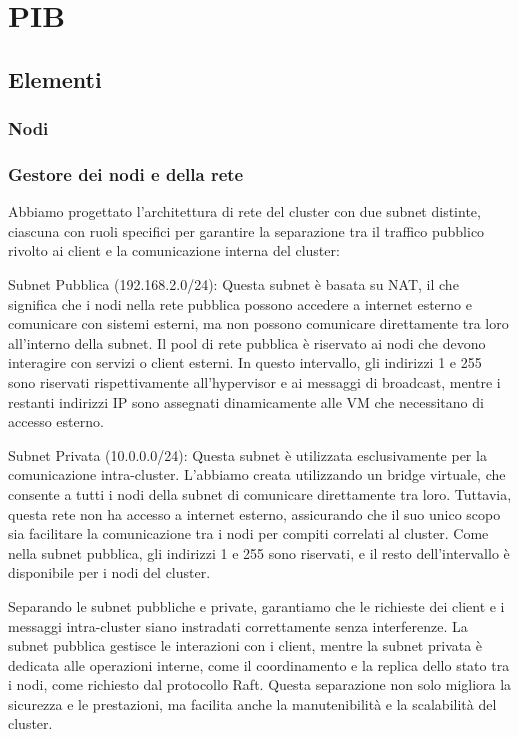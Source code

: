 
\section{PIB}
\subsection{Elementi}
\subsubsection{Nodi}

\subsubsection{Gestore dei nodi e della rete}
Abbiamo progettato l'architettura di rete del cluster con due subnet distinte, ciascuna con ruoli specifici per garantire la separazione tra il traffico pubblico rivolto ai client e la comunicazione interna del cluster:

    Subnet Pubblica (192.168.2.0/24): Questa subnet è basata su NAT, il che significa che i nodi nella rete pubblica possono accedere a internet esterno e comunicare con sistemi esterni, ma non possono comunicare direttamente tra loro all'interno della subnet. Il pool di rete pubblica è riservato ai nodi che devono interagire con servizi o client esterni. In questo intervallo, gli indirizzi 1 e 255 sono riservati rispettivamente all'hypervisor e ai messaggi di broadcast, mentre i restanti indirizzi IP sono assegnati dinamicamente alle VM che necessitano di accesso esterno.

    Subnet Privata (10.0.0.0/24): Questa subnet è utilizzata esclusivamente per la comunicazione intra-cluster. L'abbiamo creata utilizzando un bridge virtuale, che consente a tutti i nodi della subnet di comunicare direttamente tra loro. Tuttavia, questa rete non ha accesso a internet esterno, assicurando che il suo unico scopo sia facilitare la comunicazione tra i nodi per compiti correlati al cluster. Come nella subnet pubblica, gli indirizzi 1 e 255 sono riservati, e il resto dell'intervallo è disponibile per i nodi del cluster.

Separando le subnet pubbliche e private, garantiamo che le richieste dei client e i messaggi intra-cluster siano instradati correttamente senza interferenze. La subnet pubblica gestisce le interazioni con i client, mentre la subnet privata è dedicata alle operazioni interne, come il coordinamento e la replica dello stato tra i nodi, come richiesto dal protocollo Raft. Questa separazione non solo migliora la sicurezza e le prestazioni, ma facilita anche la manutenibilità e la scalabilità del cluster.
